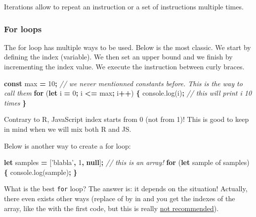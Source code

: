 \documentclass[]{book}
\newenvironment{Shaded}{\begin{snugshade}}{\end{snugshade}}
\newcommand{\AttributeTok}[1]{\textcolor[rgb]{0.77,0.63,0.00}{#1}}
\newcommand{\CommentTok}[1]{\textcolor[rgb]{0.56,0.35,0.01}{\textit{#1}}}
\newcommand{\ControlFlowTok}[1]{\textcolor[rgb]{0.13,0.29,0.53}{\textbf{#1}}}
\newcommand{\DecValTok}[1]{\textcolor[rgb]{0.00,0.00,0.81}{#1}}
\newcommand{\KeywordTok}[1]{\textcolor[rgb]{0.13,0.29,0.53}{\textbf{#1}}}
\newcommand{\NormalTok}[1]{#1}
\newcommand{\OperatorTok}[1]{\textcolor[rgb]{0.81,0.36,0.00}{\textbf{#1}}}
\newcommand{\StringTok}[1]{\textcolor[rgb]{0.31,0.60,0.02}{#1}}
\newcommand{\VariableTok}[1]{\textcolor[rgb]{0.00,0.00,0.00}{#1}}
\begin{document}
Iterations allow to repeat an instruction or a set of instructions multiple times.

\hypertarget{for-loops}{%
\subsubsection{For loops}\label{for-loops}}

The for loop has multiple ways to be used. Below is the most classic. We start by defining the index (variable). We then set an upper bound and we finish by incrementing the index value. We execute the instruction between curly braces.

\begin{Shaded}
\begin{Highlighting}[]
\KeywordTok{const}\NormalTok{ max }\OperatorTok{=} \DecValTok{10}\OperatorTok{;} \CommentTok{// we never mentionned constants before. This is the way to call them}
\ControlFlowTok{for}\NormalTok{ (}\KeywordTok{let}\NormalTok{ i }\OperatorTok{=} \DecValTok{0}\OperatorTok{;}\NormalTok{ i }\OperatorTok{<=}\NormalTok{ max}\OperatorTok{;}\NormalTok{ i}\OperatorTok{++}\NormalTok{) }\OperatorTok{\{}
  \VariableTok{console}\NormalTok{.}\AttributeTok{log}\NormalTok{(i)}\OperatorTok{;} \CommentTok{// this will print i 10 times}
\OperatorTok{\}}
\end{Highlighting}
\end{Shaded}

Contrary to R, JavaScript index starts from 0 (not from 1)! This is good to keep in mind when we will mix both R and JS.

Below is another way to create a for loop:

\begin{Shaded}
\begin{Highlighting}[]
\KeywordTok{let}\NormalTok{ samples }\OperatorTok{=}\NormalTok{ [}\StringTok{'blabla'}\OperatorTok{,} \DecValTok{1}\OperatorTok{,} \KeywordTok{null}\NormalTok{]}\OperatorTok{;} \CommentTok{// this is an array!}
\ControlFlowTok{for}\NormalTok{ (}\KeywordTok{let}\NormalTok{ sample of samples) }\OperatorTok{\{}
 \VariableTok{console}\NormalTok{.}\AttributeTok{log}\NormalTok{(sample)}\OperatorTok{;}
\OperatorTok{\}}
\end{Highlighting}
\end{Shaded}

What is the best \texttt{for} loop? The answer is: it depends on the situation! Actually, there even exists other ways (replace of by in and you get the indexes of the array, like the with the first code, but this is really \href{https://hacks.mozilla.org/2015/04/es6-in-depth-iterators-and-the-for-of-loop/}{not recommended}).
\end{document}
